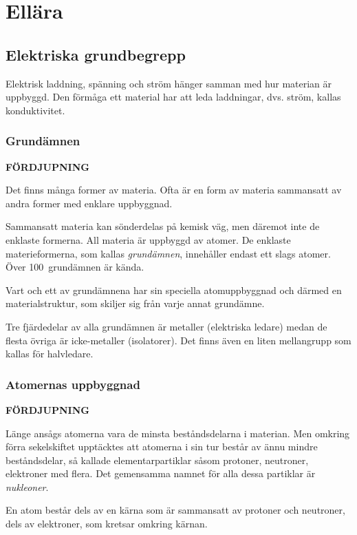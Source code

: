 \chapter{Ellära}
\label{ellära}

\section{Elektriska grundbegrepp}


Elektrisk laddning, spänning och ström hänger samman med hur materian är
uppbyggd.
Den förmåga ett material har att leda laddningar, dvs. ström, kallas
konduktivitet.

\subsection{Grundämnen}
\textbf{FÖRDJUPNING}

Det finns många former av materia.
Ofta är en form av materia sammansatt av andra former med enklare uppbyggnad.

Sammansatt materia kan sönderdelas på kemisk väg, men däremot inte de enklaste
formerna.
All materia är uppbyggd av atomer.
De enklaste materieformerna, som kallas \emph{grundämnen}, innehåller endast
ett slags atomer.
Över 100~grundämnen är kända.

Vart och ett av grundämnena har sin speciella atomuppbyggnad och därmed en
materialstruktur, som skiljer sig från varje annat grundämne.

Tre fjärdedelar av alla grundämnen är metaller (elektriska ledare) medan de
flesta övriga är icke-metaller (isolatorer).
Det finns även en liten mellangrupp som kallas för halvledare.

\subsection{Atomernas uppbyggnad}
\textbf{FÖRDJUPNING}

Länge ansågs atomerna vara de minsta beståndsdelarna i materian.
Men omkring förra sekelskiftet upptäcktes att atomerna i sin tur består av ännu mindre
beståndsdelar, så kallade elementarpartiklar såsom protoner, neutroner, elektroner
med flera.
Det gemensamma namnet för alla dessa partiklar är \emph{nukleoner}.

En atom består dels av en kärna som är sammansatt av protoner och neutroner,
dels av elektroner, som kretsar omkring kärnan.

